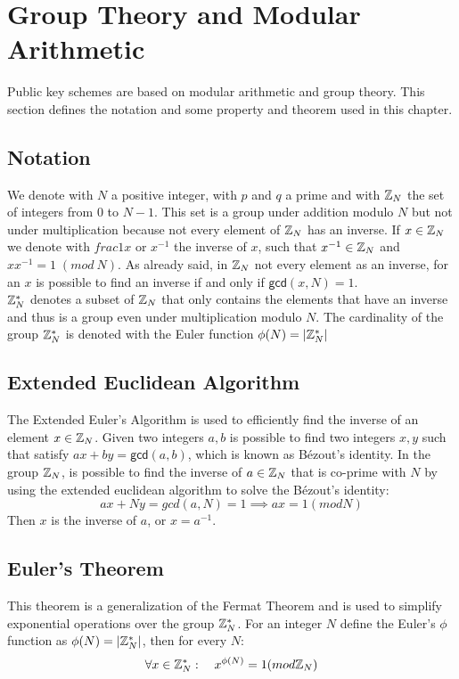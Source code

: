 \section{Group Theory and Modular Arithmetic}
Public key schemes are based on modular arithmetic and group theory. This section defines the notation and some property and theorem used in this chapter.
\subsection{Notation}
We denote with $N$ a positive integer, with $p$ and $q$ a prime and with $\mathbb{Z}_N$ the set of integers from $0$ to $N-1$. This set is a group under addition modulo $N$ but not under multiplication because not every element of $\mathbb{Z}_N$ has an inverse. If $x \in \mathbb{Z}_N$ we denote with $frac{1}{x}$ or $x^{-1}$ the inverse of $x$, such that $x^{-1} \in \mathbb{Z}_N$ and $xx^{-1} = 1 \; (mod \: N)$. As already said, in $\mathbb{Z}_N$ not every element as an inverse, for an $x$ is possible to find an inverse if and only if $\mathsf{gcd}(x,N) = 1$.\\
$\mathbb{Z}_N^{*}$ denotes a subset of $\mathbb{Z}_N$ that only contains the elements that have an inverse and thus is a group even under multiplication modulo $N$. The cardinality of the group $\mathbb{Z}_N^{*}$ is denoted with the Euler function $\phi(N) = |\mathbb{Z}_N^{*}|$
\subsection{Extended Euclidean Algorithm}
The Extended Euler's Algorithm is used to efficiently find the inverse of an element $x \in \mathbb{Z}_N$. Given two integers $a, b$ is possible to find two integers $x, y$ such that satisfy $ax + by = \mathsf{gcd}(a, b)$, which is known as Bézout's identity.
In the group $\mathbb{Z}_N$, is possible to find the inverse of $a \in \mathbb{Z}_N$ that is co-prime with $N$ by using the extended euclidean algorithm to solve the Bézout's identity:
$$
   ax+Ny = gcd(a, N) = 1 \implies ax = 1 (mod N)
$$
Then $x$ is the inverse of $a$, or $x = a^{-1}$.
\subsection{Euler's Theorem}
This theorem is a generalization of the Fermat Theorem and is used to simplify exponential operations over the group $\mathbb{Z}_N^{*}$. For an integer $N$ define the Euler's $\phi$ function as $\phi(N) = |\mathbb{Z}_N^{*}|$, then for every $N$:
$$\forall x \in \mathbb{Z}_N^{*}: \quad x^{\phi(N)} = 1 (mod \mathbb{Z}_N)$$
